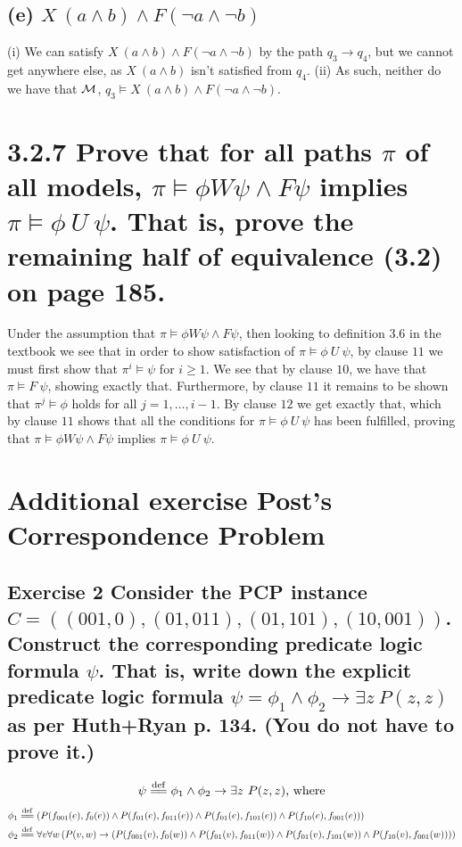 \documentclass[11pt,a4paper]{article}
\let\imp\to
\def\eqdef{\overset{\mathrm{def}}{=\joinrel=}}
\begin{document}
\subsection*{(e) \mdseries $X{\ }(a \land b) \land F(\neg a \land \neg b)$}
(i) We can satisfy $X{\ }(a \land b) \land F(\neg a \land \neg b)$ by the path
$q_3 \imp q_4$, but we cannot get anywhere else, as $X{\ }(a \land b)$ isn't
satisfied from $q_4$. (ii) As such, neither do we have that $\cal M$, $q_3
\models X{\ }(a \land b) \land F(\neg a \land \neg b)$.

\section*{3.2.7 \mdseries Prove that for all paths $\pi$ of all models,
$\pi \models \phi W \psi \land F \psi$ implies
$\pi \models \phi{\ }U{\ }\psi$. That is, prove the remaining half of
equivalence (3.2) on page 185.}
Under the assumption that $\pi \models \phi W \psi \land F \psi$, then
looking to definition 3.6 in the textbook we see that in order to show
satisfaction of $\pi \models \phi{\ }U{\ }\psi$, by clause $11$ we must first
show that $\pi^i \models \psi$ for $i \geq 1$. We see that by clause $10$, we
have that $\pi \models F{\ }\psi$, showing exactly that. Furthermore, by
clause $11$ it remains to be shown that $\pi^j \models \phi$ holds for all
$j = 1, \dots, i-1$. By clause $12$ we get exactly that, which by clause $11$
shows that all the conditions for $\pi \models \phi{\ }U{\ }\psi$ has been
fulfilled, proving that $\pi \models \phi W \psi \land F \psi$ implies
$\pi \models \phi{\ }U{\ }\psi$.

\section*{Additional exercise \mdseries Post's Correspondence Problem}

\subsection*{Exercise 2 \mdseries Consider the PCP instance $C = ((001, 0),
(01, 011), (01, 101), (10, 001))$. Construct the corresponding predicate logic
formula $\psi$. That is, write down the explicit predicate logic formula $\psi
= \phi_1 \land \phi_2 \imp \exists z{\ }P(z, z)$ as per Huth+Ryan p. 134. (You
do not have to prove it.)}
\begin{align*}
	\psi \eqdef \phi_1 \land \phi_2 \imp \exists z{\ }P(z, z)
	\text{, where}
\end{align*}
\small
\begin{align*}
	\phi_1 &\eqdef \left(
	P(f_{001}(e),f_{0}(e)) \land
	P(f_{01}(e),f_{011}(e)) \land
	P(f_{01}(e),f_{101}(e)) \land
	P(f_{10}(e),f_{001}(e))
	\right) \\
	\phi_2 &\eqdef \forall v \forall w \left( P(v, w) \imp \left(
	P(f_{001}(v),f_{0}(w)) \land
	P(f_{01}(v),f_{011}(w)) \land
	P(f_{01}(v),f_{101}(w)) \land
	P(f_{10}(v),f_{001}(w))
	\right)\right)
\end{align*}
\normalsize
\end{document}

